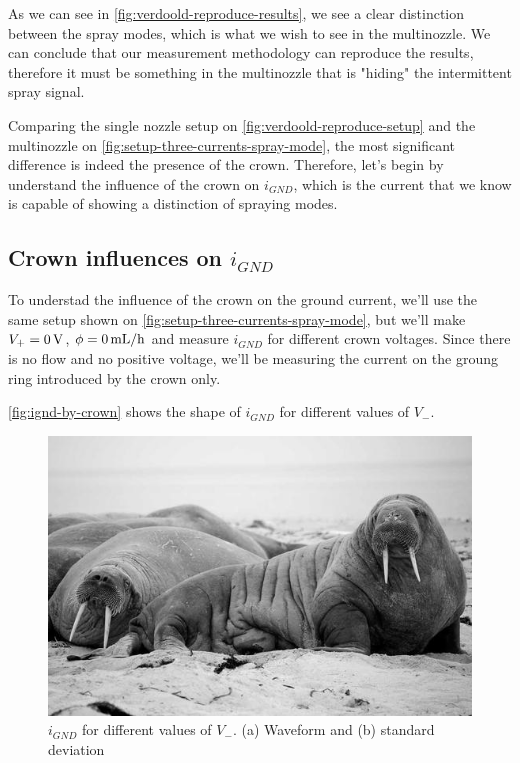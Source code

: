 \documentclass[oneside,12pt]{article}
\begin{document}
As we can see in \autoref{fig:verdoold-reproduce-results}, we see a clear distinction between the spray modes, 
which is what we wish to see in the multinozzle. We can conclude that our measurement methodology can 
reproduce the results, therefore it must be something in the multinozzle that is "hiding" the intermittent spray 
signal.

Comparing the single nozzle setup on \autoref{fig:verdoold-reproduce-setup} and the multinozzle on \autoref{fig:setup-three-currents-spray-mode}, 
the most significant difference is indeed the presence of the crown. Therefore, let's begin by understand the influence 
of the crown on $i_{GND}$, which is the current that we know is capable of showing a distinction of spraying 
modes. 

\subsection{Crown influences on $i_{GND}$}

To understad the influence of the crown on the ground current, we'll use the same setup shown on 
\autoref{fig:setup-three-currents-spray-mode}, but we'll make $V_+ = 0 \,\mathrm{V}$, $\phi = 0 \,\mathrm{mL / h}$ and measure $i_{GND}$ for different
crown voltages. Since there is no flow 
and no positive voltage, we'll be measuring the current on the groung ring introduced by the crown only.

\autoref{fig:ignd-by-crown} shows the shape of $i_{GND}$ for different values of $V_-$.

\begin{figure}[h!]
    \centering
    \includegraphics[width=.8\textwidth,trim=1 1 1 1,clip]{figures/lorem-picsum.jpg}
    \caption{$i_{GND}$ for different values of $V_-$. (a) Waveform and (b) standard deviation}
    \label{fig:ignd-by-crown}
\end{figure}
\end{document}
